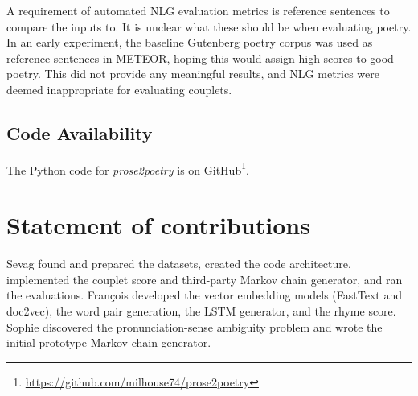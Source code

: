 \documentclass[11pt,a4paper]{article}
\begin{document}
A requirement of automated NLG evaluation metrics is reference sentences to compare the inputs to. It is unclear what these should be when evaluating poetry. In an early experiment, the baseline Gutenberg poetry corpus was used as reference sentences in METEOR, hoping this would assign high scores to good poetry. This did not provide any meaningful results, and NLG metrics were deemed inappropriate for evaluating couplets.

\subsection{Code Availability}

The Python code for \textit{prose2poetry} is on GitHub\footnote{\href{https://github.com/milhouse74/prose2poetry}{https://github.com/milhouse74/prose2poetry}}.

\section{Statement of contributions}
\label{sec:contributions}
Sevag found and prepared the datasets, created the code architecture, implemented the couplet score and third-party Markov chain generator, and ran the evaluations. François developed the vector embedding models (FastText and doc2vec), the word pair generation, the LSTM generator, and the rhyme score. Sophie discovered the pronunciation-sense ambiguity problem and wrote the initial prototype Markov chain generator.

\vfill
\clearpage %



\end{document}
